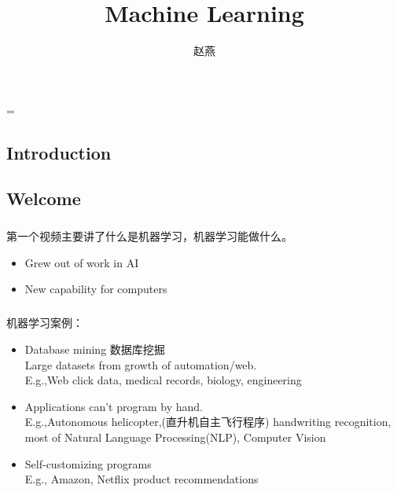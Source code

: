 \documentclass{article}
\title{Machine Learning}
\author{赵燕}
\date{}
\begin{document}
 
\hfuzz=\maxdimen
{}
\begin{CJK}{UTF8}{gbsn} 
\maketitle
\tableofcontents
\newpage

\section{Introduction}
\subsection{Welcome}
\subparagraph*{}
 第一个视频主要讲了什么是机器学习，机器学习能做什么。
\begin{itemize}
  \item Grew out of work in AI
  \item New capability for computers
\end{itemize}
\subparagraph*{}
 机器学习案例：
\begin{itemize}
  \item Database mining 数据库挖掘\\
   Large datasets from growth of automation/web.\\
   E.g.,Web click data, medical records, biology, engineering
  \item Applications can't program by hand.\\
   E.g.,Autonomous helicopter,(直升机自主飞行程序) handwriting recognition, most of Natural Language Processing(NLP), Computer Vision
  \item Self-customizing programs\\
   E.g., Amazon, Netflix product recommendations
\end{itemize}

\end{CJK}
\end{document}
